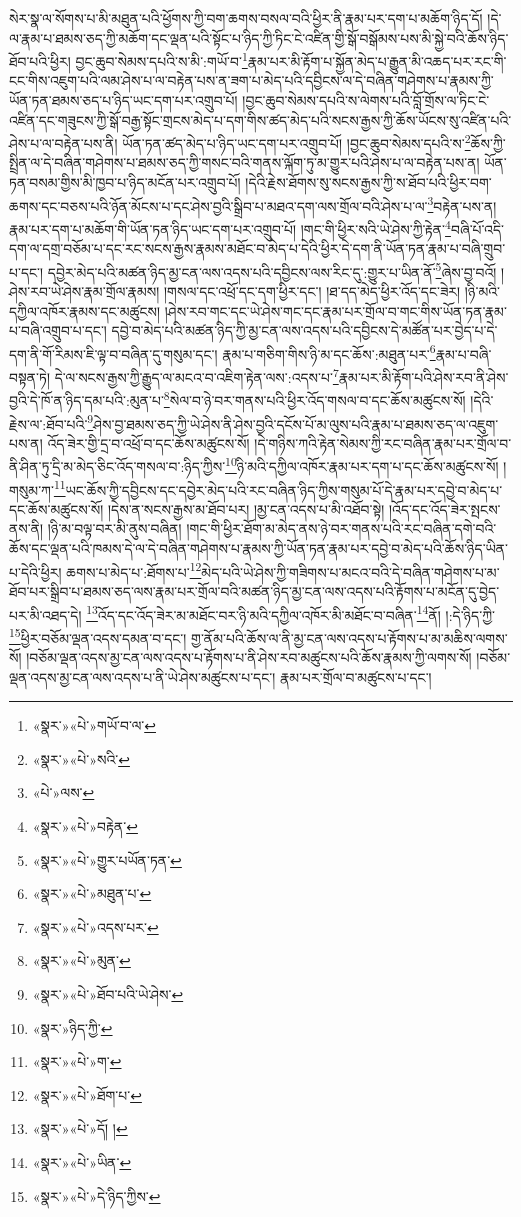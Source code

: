 སེར་སྣ་ལ་སོགས་པ་མི་མཐུན་པའི་ཕྱོགས་ཀྱི་བག་ཆགས་བསལ་བའི་ཕྱིར་ནི་རྣམ་པར་དག་པ་མཆོག་ཉིད་དོ། །དེ་ལ་རྣམ་པ་ཐམས་ཅད་ཀྱི་མཆོག་དང་ལྡན་པའི་སྟོང་པ་ཉིད་ཀྱི་ཏིང་ངེ་འཛིན་གྱི་སྒོ་བསྒོམས་པས་མི་སྐྱེ་བའི་ཆོས་ཉིད་ཐོབ་པའི་ཕྱིར། བྱང་ཆུབ་སེམས་དཔའི་ས་མི་:གཡོ་བ་\footnote{«སྣར་»«པེ་»གཡོ་བ་ལ་}རྣམ་པར་མི་རྟོག་པ་སྐྱོན་མེད་པ་རྒྱུན་མི་འཆད་པར་རང་གི་ངང་གིས་འཇུག་པའི་ལམ་ཤེས་པ་ལ་བརྟེན་པས་ན་ཟག་པ་མེད་པའི་དབྱིངས་ལ་དེ་བཞིན་གཤེགས་པ་རྣམས་ཀྱི་ཡོན་ཏན་ཐམས་ཅད་པ་ཉིད་ཡང་དག་པར་འགྲུབ་པོ། །བྱང་ཆུབ་སེམས་དཔའི་ས་ལེགས་པའི་བློ་གྲོས་ལ་ཏིང་ངེ་འཛིན་དང་གཟུངས་ཀྱི་སྒོ་བརྒྱ་སྟོང་གྲངས་མེད་པ་དག་གིས་ཚད་མེད་པའི་སངས་རྒྱས་ཀྱི་ཆོས་ཡོངས་སུ་འཛིན་པའི་ཤེས་པ་ལ་བརྟེན་པས་ནི། ཡོན་ཏན་ཚད་མེད་པ་ཉིད་ཡང་དག་པར་འགྲུབ་པོ། །བྱང་ཆུབ་སེམས་དཔའི་ས་\footnote{«སྣར་»«པེ་»སའི་}ཆོས་ཀྱི་སྤྲིན་ལ་དེ་བཞིན་གཤེགས་པ་ཐམས་ཅད་ཀྱི་གསང་བའི་གནས་ལྐོག་ཏུ་མ་གྱུར་པའི་ཤེས་པ་ལ་བརྟེན་པས་ན། ཡོན་ཏན་བསམ་གྱིས་མི་ཁྱབ་པ་ཉིད་མངོན་པར་འགྲུབ་པོ། །དེའི་རྗེས་ཐོགས་སུ་སངས་རྒྱས་ཀྱི་ས་ཐོབ་པའི་ཕྱིར་བག་ཆགས་དང་བཅས་པའི་ཉོན་མོངས་པ་དང་ཤེས་བྱའི་སྒྲིབ་པ་མཐའ་དག་ལས་གྲོལ་བའི་ཤེས་པ་ལ་\footnote{«པེ་»ལས་}བརྟེན་པས་ན། རྣམ་པར་དག་པ་མཆོག་གི་ཡོན་ཏན་ཉིད་ཡང་དག་པར་འགྲུབ་པོ། །གང་གི་ཕྱིར་སའི་ཡེ་ཤེས་ཀྱི་རྟེན་\footnote{«སྣར་»«པེ་»བརྟེན་}བཞི་པོ་འདི་དག་ལ་དགྲ་བཅོམ་པ་དང་རང་སངས་རྒྱས་རྣམས་མཐོང་བ་མེད་པ་དེའི་ཕྱིར་དེ་དག་ནི་ཡོན་ཏན་རྣམ་པ་བཞི་གྲུབ་པ་དང་། དབྱེར་མེད་པའི་མཚན་ཉིད་མྱ་ངན་ལས་འདས་པའི་དབྱིངས་ལས་རིང་དུ་:གྱུར་པ་ཡིན་ནོ་\footnote{«སྣར་»«པེ་»གྱུར་པཡོན་ཏན་}ཞེས་བྱ་བའོ། །ཤེས་རབ་ཡེ་ཤེས་རྣམ་གྲོལ་རྣམས། །གསལ་དང་འཕྲོ་དང་དག་ཕྱིར་དང་། །ཐ་དད་མེད་ཕྱིར་འོད་དང་ཟེར། །ཉི་མའི་དཀྱིལ་འཁོར་རྣམས་དང་མཚུངས། །ཤེས་རབ་གང་དང་ཡེ་ཤེས་གང་དང་རྣམ་པར་གྲོལ་བ་གང་གིས་ཡོན་ཏན་རྣམ་པ་བཞི་འགྲུབ་པ་དང་། དབྱེ་བ་མེད་པའི་མཚན་ཉིད་ཀྱི་མྱ་ངན་ལས་འདས་པའི་དབྱིངས་དེ་མཚོན་པར་བྱེད་པ་དེ་དག་ནི་གོ་རིམས་ཇི་ལྟ་བ་བཞིན་དུ་གསུམ་དང་། རྣམ་པ་གཅིག་གིས་ཉི་མ་དང་ཆོས་:མཐུན་པར་\footnote{«སྣར་»«པེ་»མཐུན་པ་}རྣམ་པ་བཞི་བསྟན་ཏེ། དེ་ལ་སངས་རྒྱས་ཀྱི་རྒྱུད་ལ་མངའ་བ་འཇིག་རྟེན་ལས་:འདས་པ་\footnote{«སྣར་»«པེ་»འདས་པར་}རྣམ་པར་མི་རྟོག་པའི་ཤེས་རབ་ནི་ཤེས་བྱའི་དེ་ཁོ་ན་ཉིད་དམ་པའི་:མུན་པ་\footnote{«སྣར་»«པེ་»མུན་}སེལ་བ་ཉེ་བར་གནས་པའི་ཕྱིར་འོད་གསལ་བ་དང་ཆོས་མཚུངས་སོ། །དེའི་རྗེས་ལ་:ཐོབ་པའི་\footnote{«སྣར་»«པེ་»ཐོབ་པའི་ཡེ་ཤེས་}ཤེས་བྱ་ཐམས་ཅད་ཀྱི་ཡེ་ཤེས་ནི་ཤེས་བྱའི་དངོས་པོ་མ་ལུས་པའི་རྣམ་པ་ཐམས་ཅད་ལ་འཇུག་པས་ན། འོད་ཟེར་གྱི་དྲ་བ་འཕྲོ་བ་དང་ཆོས་མཚུངས་སོ། །དེ་གཉིས་ཀའི་རྟེན་སེམས་ཀྱི་རང་བཞིན་རྣམ་པར་གྲོལ་བ་ནི་ཤིན་ཏུ་དྲི་མ་མེད་ཅིང་འོད་གསལ་བ་:ཉིད་ཀྱིས་\footnote{«སྣར་»ཉིད་ཀྱི་}ཉི་མའི་དཀྱིལ་འཁོར་རྣམ་པར་དག་པ་དང་ཆོས་མཚུངས་སོ། །གསུམ་ཀ་\footnote{«སྣར་»«པེ་»ག་}ཡང་ཆོས་ཀྱི་དབྱིངས་དང་དབྱེར་མེད་པའི་རང་བཞིན་ཉིད་ཀྱིས་གསུམ་པོ་དེ་རྣམ་པར་དབྱེ་བ་མེད་པ་དང་ཆོས་མཚུངས་སོ། །དེས་ན་སངས་རྒྱས་མ་ཐོབ་པར། །མྱ་ངན་འདས་པ་མི་འཐོབ་སྟེ། །འོད་དང་འོད་ཟེར་སྤངས་ནས་ནི། །ཉི་མ་བལྟ་བར་མི་ནུས་བཞིན། །གང་གི་ཕྱིར་ཐོག་མ་མེད་ནས་ཉེ་བར་གནས་པའི་རང་བཞིན་དགེ་བའི་ཆོས་དང་ལྡན་པའི་ཁམས་དེ་ལ་དེ་བཞིན་གཤེགས་པ་རྣམས་ཀྱི་ཡོན་ཏན་རྣམ་པར་དབྱེ་བ་མེད་པའི་ཆོས་ཉིད་ཡིན་པ་དེའི་ཕྱིར། ཆགས་པ་མེད་པ་:ཐོགས་པ་\footnote{«སྣར་»«པེ་»ཐོག་པ་}མེད་པའི་ཡེ་ཤེས་ཀྱི་གཟིགས་པ་མངའ་བའི་དེ་བཞིན་གཤེགས་པ་མ་ཐོབ་པར་སྒྲིབ་པ་ཐམས་ཅད་ལས་རྣམ་པར་གྲོལ་བའི་མཚན་ཉིད་མྱ་ངན་ལས་འདས་པའི་རྟོགས་པ་མངོན་དུ་བྱེད་པར་མི་འཐད་དེ། \footnote{«སྣར་»«པེ་»དོ། ། }འོད་དང་འོད་ཟེར་མ་མཐོང་བར་ཉི་མའི་དཀྱིལ་འཁོར་མི་མཐོང་བ་བཞིན་\footnote{«སྣར་»«པེ་»ཡིན་}ནོ། །:དེ་ཉིད་ཀྱི་\footnote{«སྣར་»«པེ་»དེ་ཉིད་ཀྱིས་}ཕྱིར་བཅོམ་ལྡན་འདས་དམན་བ་དང་། གྱ་ནོམ་པའི་ཆོས་ལ་ནི་མྱ་ངན་ལས་འདས་པ་རྟོགས་པ་མ་མཆིས་ལགས་སོ། །བཅོམ་ལྡན་འདས་མྱ་ངན་ལས་འདས་པ་རྟོགས་པ་ནི་ཤེས་རབ་མཚུངས་པའི་ཆོས་རྣམས་ཀྱི་ལགས་སོ། །བཅོམ་ལྡན་འདས་མྱ་ངན་ལས་འདས་པ་ནི་ཡེ་ཤེས་མཚུངས་པ་དང་། རྣམ་པར་གྲོལ་བ་མཚུངས་པ་དང་། 